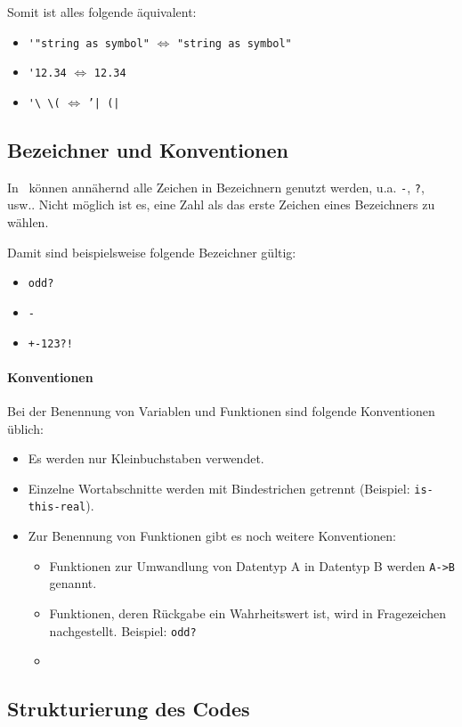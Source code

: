 		Somit ist alles folgende äquivalent:
		\begin{itemize}
			\item \lstinline[language = Racket]|'"string as symbol"| \(\iff\) \lstinline[language = Racket]|"string as symbol"|
			\item \lstinline[language = Racket]|'12.34| \(\iff\) \lstinline[language = Racket]|12.34|
			\item \lstinline[language = Racket]|'\ \(| \(\iff\) \texttt{'| (|} 
		\end{itemize}

\subsection{Bezeichner und Konventionen}

	In \racket\, können annähernd alle Zeichen in Bezeichnern genutzt werden, u.a. \texttt{-}, \texttt{?}, usw.. Nicht möglich ist es, eine Zahl als das erste Zeichen eines Bezeichners zu wählen.
	
	Damit sind beispielsweise folgende Bezeichner gültig:
	\begin{itemize}
		\item \texttt{odd?}
		\item \texttt{-}
		\item \texttt{+-123?!}
	\end{itemize}

	\paragraph{Konventionen}
		Bei der Benennung von Variablen und Funktionen sind folgende Konventionen üblich:
		\begin{itemize}
			\item Es werden nur Kleinbuchstaben verwendet.
			\item Einzelne Wortabschnitte werden mit Bindestrichen getrennt (Beispiel: \texttt{is-this-real}).
			\item Zur Benennung von Funktionen gibt es noch weitere Konventionen:
				\begin{itemize}
					\item Funktionen zur Umwandlung von Datentyp A in Datentyp B werden \texttt{A->B} genannt.
					\item Funktionen, deren Rückgabe ein Wahrheitswert ist, wird in Fragezeichen nachgestellt. Beispiel: \texttt{odd?}
					\item {}
				\end{itemize}
		\end{itemize}

\subsection{Strukturierung des Codes}
